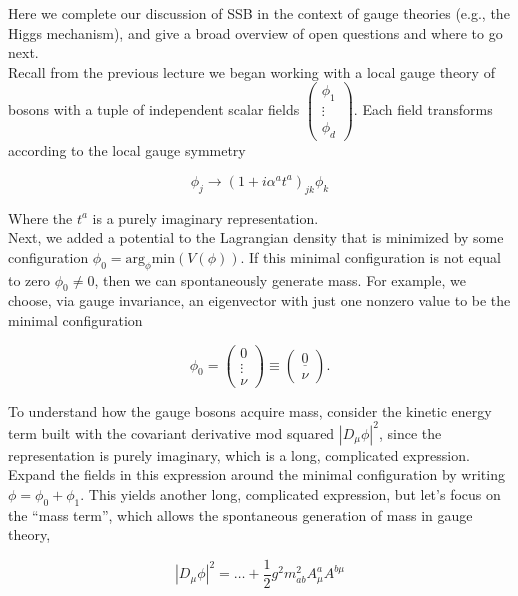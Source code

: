 \noindent Here we complete our discussion of SSB in the context of gauge theories (e.g., the Higgs mechanism), and give a broad overview of open questions and where to go next. \\

\noindent Recall from the previous lecture we began working with a local gauge theory of bosons with a tuple of independent scalar fields $\begin{pmatrix} \phi_1 \\ \vdots \\ \phi_d \end{pmatrix}$. Each field transforms according to the local gauge symmetry

\begin{equation}
\phi_j \rightarrow (1 + i \alpha^a t^a)_{jk} \phi_k
\end{equation}

\noindent Where the $t^a$ is a purely imaginary representation. \\

\noindent Next, we added a potential to the Lagrangian density that is minimized by some configuration $\phi_0 = \text{arg}_{\phi} \text{min} (V(\phi))$. If this minimal configuration is not equal to zero $\phi_0 \ne 0$, then we can spontaneously generate mass. For example, we choose, via gauge invariance, an eigenvector with just one nonzero value to be the minimal configuration

\begin{equation}
\phi_0 = \begin{pmatrix} 0 \\ \vdots \\ \nu \end{pmatrix} \equiv \begin{pmatrix} \underline{0} \\ \nu \end{pmatrix}.
\end{equation}

\noindent To understand how the gauge bosons acquire mass, consider the kinetic energy term built with the covariant derivative mod squared $|D_\mu \phi |^2$, since the representation is purely imaginary, which is a long, complicated expression. Expand the fields in this expression around the minimal configuration by writing $\phi = \phi_0 + \phi_1$. This yields another long, complicated expression, but let's focus on the ``mass term'', which allows the spontaneous generation of mass in gauge theory,

\begin{equation}
|D_\mu \phi|^2 = \dots + \frac{1}{2} g^2 m_{ab}^2 A_\mu^a A^{b \mu}
\end{equation}

